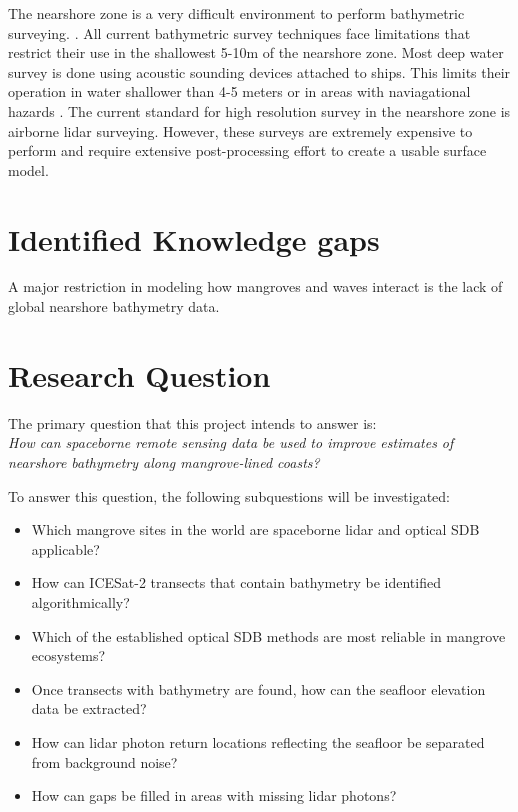 The nearshore zone is a very difficult environment to perform bathymetric surveying. \parencite{Parrish2019}. All current bathymetric survey techniques face limitations that restrict their use in the shallowest 5-10m of the nearshore zone. Most deep water survey is done using acoustic sounding devices attached to ships. This limits their operation in water shallower than 4-5 meters or in areas with naviagational hazards \parencite{Cesbron2021,add}. The current standard for high resolution survey in the nearshore zone is airborne lidar surveying. However, these surveys are extremely expensive to perform and require extensive post-processing effort to create a usable surface model.

\section{Identified Knowledge gaps}
A major restriction in modeling how mangroves and waves interact is the lack of global nearshore bathymetry data.  
\section{Research Question}
The primary question that this project intends to answer is: \\

\vspace{2mm}
\emph{How can spaceborne remote sensing data be used to improve estimates of nearshore bathymetry along mangrove-lined coasts?}

To answer this question, the following subquestions will be investigated:

\begin{itemize}
      \item Which mangrove sites in the world are spaceborne lidar and optical SDB applicable?
      \item How can ICESat-2 transects that contain bathymetry be identified algorithmically?
      \item Which of the established optical SDB methods are most reliable in mangrove ecosystems?
      \item Once transects with bathymetry are found, how can the seafloor elevation data be extracted?
      \item How can lidar photon return locations reflecting the seafloor be separated from background noise?
      \item How can gaps be filled in areas with missing lidar photons?
\end{itemize}

